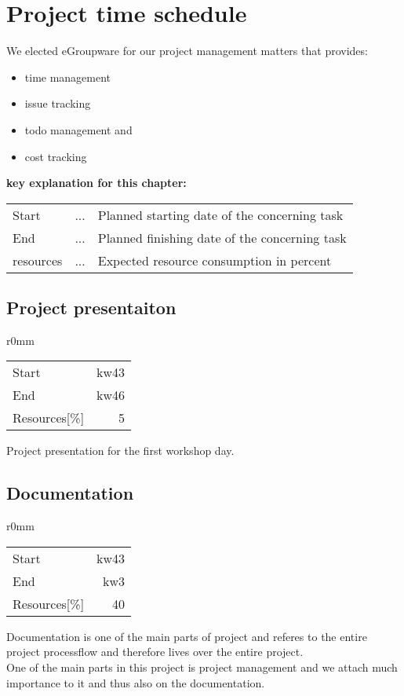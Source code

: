\section{Project time schedule}

We elected eGroupware for our project management matters that provides:
\begin{itemize}
 \item time management
 \item issue tracking
 \item todo management and
 \item cost tracking
\end{itemize}

\textbf{key explanation for this chapter:} \\
\begin{tabular}{lcl}
Start & ... & Planned starting date of the concerning task\\
End   & ... & Planned finishing date of the concerning task\\ 
resources & ... & Expected resource consumption in percent\\
\end{tabular}


\subsection{Project presentaiton}
\begin{wrapfigure}{r}{0mm}
\begin{tabular}[t]{|lr|}
\hline
Start & kw43\\
End & kw46\\
Resources[\%] & 5\\
\hline
\end{tabular}
\end{wrapfigure}
Project presentation for the first workshop day.\\

\subsection{Documentation}
\begin{wrapfigure}{r}{0mm}
\begin{tabular}[t]{|lr|}
\hline
Start & kw43\\
End & kw3\\
Resources[\%] & 40\\
\hline
\end{tabular}
\end{wrapfigure}
Documentation is one of the main parts of project and referes to the entire project 
processflow and therefore lives over the entire project.\\
One of the main parts in this project is project management and we attach much 
importance to it and thus also on the documentation.\\

